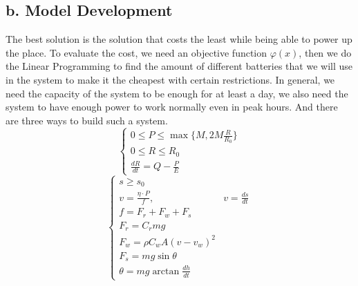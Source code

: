\documentclass[12pt]{article}
\begin{document}
\subsection{b. Model Development}
The best solution is the solution that costs the least while being able to power up the place. To evaluate the cost, we need an objective function $\varphi (x)$, then we do the Linear Programming
to find the amount of different batteries that we will use in the system to make it the cheapest with certain restrictions. In general, we need the  capacity of the system to be enough for
at least a day, we also need the system to have enough power to work normally even in peak hours.
And there are three ways to build such a system.
\begin{equation}
    \left\{
    \begin{array}{c}
        0                \leqslant  P  \leqslant  \max \{ M,2M\frac{R}{R_0} \} \\
        0                \leqslant  R  \leqslant  R_0                          \\
        \frac{d R}{d t}  =          Q  -          \frac{P}{E}
    \end{array}
    \right.
\end{equation}
\begin{equation}
    \left\{
    \begin{array}{cc}
        s\geqslant s_0                  &                   \\
        v=\frac{\eta \cdot P}{f} ,      & v=\frac{d s}{d t} \\
        f=F_r+F_w+F_s                   &                   \\
        F_r=C_rmg                       &                   \\
        F_w=\rho C_w A(v-v_w)^2         &                   \\
        F_s=mg\sin \theta               &                   \\
        \theta=mg\arctan\frac{d h}{d t} &
    \end{array}
    \right.
\end{equation}
\end{document}
